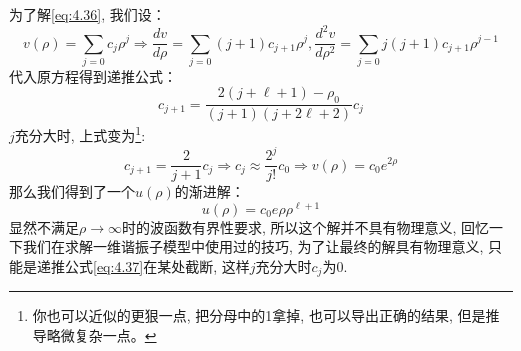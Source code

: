 \documentclass[a4paper,zihao=-4,linespread=1]{ctexrep}
\begin{document}
    为了解\ref{eq:4.36}, 我们设：
    \[v(\rho)=\sum\limits_{j=0}c_j\rho^j\Rightarrow\frac{dv}{d\rho}=\sum\limits_{j=0}\left(j+1\right)c_{j+1}\rho^j,\frac{d^2v}{d\rho^2}=\sum\limits_{j=0}j\left(j+1\right)c_{j+1}\rho^{j-1}\]
    代入原方程得到递推公式：
    \begin{equation}
        \label{eq:4.37}
        c_{j+1}=\frac{2\left(j+\ell+1\right)-\rho_0}{\left(j+1\right)\left(j+2\ell+2\right)}c_j
    \end{equation}
    $j$充分大时, 上式变为\footnote{你也可以近似的更狠一点, 把分母中的1拿掉, 也可以导出正确的结果, 但是推导略微复杂一点。}:
    \[c_{j+1}=\frac{2}{j+1}c_j\Rightarrow c_j\approx\frac{2^j}{j!}c_0\Rightarrow v(\rho)=c_0e^{2\rho}\]
    那么我们得到了一个$u(\rho)$的渐进解：
    \[u(\rho)=c_0e\rho\rho^{\ell+1}\]
    显然不满足$\rho\to\infty$时的波函数有界性要求, 所以这个解并不具有物理意义, 回忆一下我们在求解一维谐振子模型中使用过的技巧, 为了让最终的解具有物理意义,
    只能是递推公式\ref{eq:4.37}在某处截断, 这样$j$充分大时$c_j$为$0$.
\end{document}
